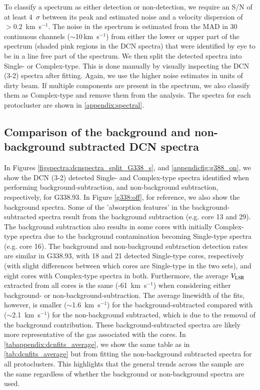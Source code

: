 \documentclass[longauth]{aa} %
\newcommand{\vlsr}{\mbox{$V_{\rm LSR}$\,}}
\newcommand{\kms}{\textrm{km~s}\ensuremath{^{-1}}\xspace}       %
\begin{document}
\begin{appendix}
To classify a spectrum as either detection or non-detection, we require an S/N of at least 4~$\sigma$ between its peak and estimated noise and a velocity dispersion of $> 0.2$~\kms. The noise in the spectrum is estimated from the MAD in 30 continuous channels ($\sim$10\,\kms) from either the lower or upper part of the spectrum (shaded pink regions in the DCN spectra) that were identified by eye to be in a line free part of the spectrum. We then split the detected spectra into Single- or Complex-type. This is done manually by visually inspecting the DCN (3-2) spectra after fitting. Again, we use the higher noise estimates in units of dirty beam. If multiple components are present in the spectrum, we also classify them as Complex-type and  remove them from the analysis. The spectra for each protocluster are shown in \cref{appendix:spectral}. 

\subsection{Comparison of the background and non-background subtracted DCN spectra}

In Figures \ref{figspectra:dcnspectra_split_G338_s}, and \ref{appendicfig:g388_on}, we show the DCN (3-2) detected Single- and Complex-type spectra identified when performing background-subtraction, and non-background subtraction, respectively, for G338.93. In Figure \ref{g338:off}, for reference, we also show the background spectra. Some of the 'absorption features' in the background-subtracted spectra result from the background subtraction (e.g. core 13 and 29). The background subtraction also results in some cores with initially Complex-type spectra due to the background contamination becoming Single-type spectra (e.g. core 16). The background and non-background subtraction detection rates are similar in G338.93, with 18 and 21 detected Single-type cores, respectively (with slight differences between which cores are Single-type in the two sets), and eight cores with Complex-type spectra in both. Furthermore, the average \vlsr extracted from all cores is the same (-61~\kms) when considering either background- or non-background-subtraction. The average linewidth of the fits, however, is smaller ($\sim$1.6~\kms) for the background-subtracted compared with ($\sim$2.1~\kms) for the non-background subtracted, which is due to the removal of the background contribution. These background-subtracted spectra are likely more representative of the gas associated with the cores. In \cref{tabappendix:dcnfits_average}, we show the same table as in \cref{tab:dcnfits_average} but from fitting the non-background subtracted spectra for all protoclusters. This highlights that the general trends across the sample are the same regardless of whether the background or non-background spectra are used.



\end{appendix}
\end{document}
